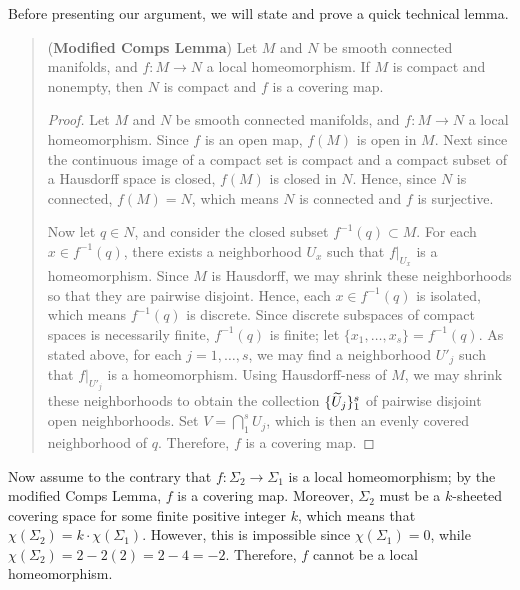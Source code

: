 \documentclass{article}
\begin{document}
\begin{solutions}
	Before presenting our argument, we will state and prove a quick technical lemma. 
		\begin{quote}
			(\textbf{Modified Comps Lemma}) Let $M$ and $N$ be smooth connected manifolds, and $f: M \to N$ a local homeomorphism. If $M$ is compact and nonempty, then $N$ is compact and $f$ is a covering map. 
			
			\begin{proof}
				Let $M$ and $N$ be smooth connected manifolds, and $f: M \to N$ a local homeomorphism. Since $f$ is an open map, $f(M)$ is open in $M$. Next since the continuous image of a compact set is compact and a compact subset of a Hausdorff space is closed, $f(M)$ is closed in $N$. Hence, since $N$ is connected, $f(M) = N$, which means $N$ is connected and $f$ is surjective. 
				
				Now let $q \in N$, and consider the closed subset $f^{-1}(q) \subset M$. For each $x \in f^{-1}(q)$, there exists a neighborhood $U_{x}$ such that $f|_{U_{x}}$ is a homeomorphism. Since $M$ is Hausdorff, we may shrink these neighborhoods so that they are pairwise disjoint. Hence, each $x \in f^{-1}(q)$ is isolated, which means $f^{-1}(q)$ is discrete. Since discrete subspaces of compact spaces is necessarily finite, $f^{-1}(q)$ is finite; let $\{x_{1}, \ldots, x_{s}\} = f^{-1}(q)$. As stated above, for each $j = 1, \ldots, s$, we may find a neighborhood $U'_{j}$ such that $f|_{U'_{j}}$ is a homeomorphism. Using Hausdorff-ness of $M$, we may shrink these neighborhoods to obtain the collection $\{\widetilde{U}_{j}\}_{1}^{s}$ of pairwise disjoint open neighborhoods. Set $V = \bigcap_{1}^{s}U_{j}$, which is then an evenly covered neighborhood of $q$. Therefore, $f$ is a covering map. 
			\end{proof}
		\end{quote} 
	Now assume to the contrary that $f: \Sigma_{2} \to \Sigma_{1}$ is a local homeomorphism; by the modified Comps Lemma, $f$ is a covering map. Moreover, $\Sigma_{2}$ must be a $k$-sheeted covering space for some finite positive integer $k$, which means that $\chi(\Sigma_{2}) = k \cdot \chi(\Sigma_{1})$. However, this is impossible since $\chi(\Sigma_{1}) = 0$, while $\chi(\Sigma_{2}) = 2 - 2(2) = 2 - 4 = -2$. Therefore, $f$ cannot be a local homeomorphism. 
\end{solutions}
\end{document}
